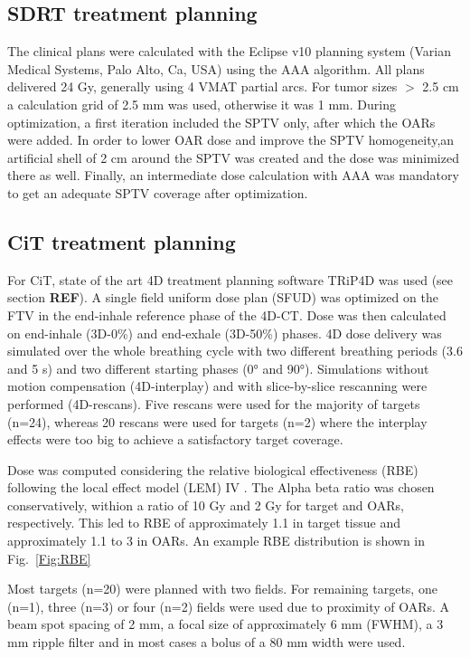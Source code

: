 \documentclass[type=dr, dr=rernat, acm$^3$entcolor=tud7b,colorbacktitle, bigchapter, openright, twoside, 12pt ]{tudthesis}
\begin{document}
\subsection{SDRT treatment planning}

The clinical plans were calculated with the Eclipse v10 planning system (Varian Medical Systems, Palo Alto, Ca, USA) using the AAA algorithm. All plans delivered 24 Gy, 
generally using 4 VMAT partial arcs. For tumor sizes $>$ 2.5 cm a calculation grid of 2.5 mm was used, otherwise it was 1 mm. During optimization, a first iteration included the 
SPTV only, after which the OARs were added. In order to lower OAR dose and improve the SPTV homogeneity,an artificial shell of 2 cm around the SPTV was created and the dose was minimized there as well.
Finally, an intermediate dose calculation with AAA was mandatory to get an adequate SPTV coverage after optimization.

\subsection{CiT treatment planning}

For CiT, state of the art 4D treatment planning software TRiP4D was used (see section \textbf{REF}). A single field uniform dose plan (SFUD) was optimized on the FTV in the end-inhale reference phase of the 4D-CT. 
Dose was then calculated on end-inhale (3D-0\%) and end-exhale (3D-50\%) phases. 4D dose delivery was simulated over the whole breathing cycle with two different breathing periods (3.6 and 5 s) and two different 
starting phases (0° and 90°). Simulations without motion compensation (4D-interplay) and with slice-by-slice rescanning were performed (4D-rescans). Five rescans were used for the majority of targets (n=24), whereas 20 rescans 
were used for targets (n=2) where the interplay effects were too big to achieve a satisfactory target coverage. 

Dose was computed considering the relative biological effectiveness (RBE) following the local effect model (LEM) IV \cite{Elsaesser2010}. The Alpha beta ratio was chosen conservatively, withion a ratio of 10 Gy
and 2 Gy for target and OARs, respectively. This led to RBE of approximately 1.1 in target tissue and approximately 1.1 to 3 in OARs. An example RBE distribution is shown in Fig.~\ref{Fig:RBE}

Most targets (n=20) were planned with two fields. For remaining targets, one (n=1), three (n=3) or four (n=2) fields were used due to proximity of OARs.
A beam spot spacing of 2 mm, a focal size of approximately 6 mm (FWHM), a 3 mm ripple filter and in most cases a bolus of a 80 mm width were used.
\end{document}
